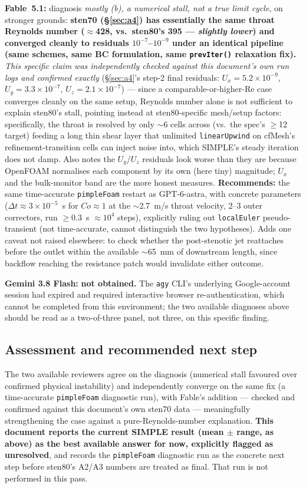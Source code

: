 \documentclass[11pt]{article}
\begin{document}
\textbf{Fable~5.1:} diagnosis \emph{mostly (b), a numerical stall, not a true limit cycle}, on
stronger grounds: \textbf{sten70 (\S\ref{sec:a4}) has essentially the same throat Reynolds number
($\approx$428, vs.\ sten80's 395 --- \emph{slightly lower}) and converged cleanly to residuals
$10^{-7}$--$10^{-9}$ under an identical pipeline (same schemes, same BC formulation, same
\texttt{prevIter()} relaxation fix).} \emph{This specific claim was independently checked against
this document's own run logs and confirmed exactly} (\S\ref{sec:a4}'s step-2 final residuals:
$U_x\!=\!5.2\times10^{-9}$, $U_y\!=\!3.3\times10^{-7}$, $U_z\!=\!2.1\times10^{-7}$) --- since a
comparable-or-higher-Re case converges cleanly on the same setup, Reynolds number alone is not
sufficient to explain sten80's stall, pointing instead at sten80-specific mesh/setup factors:
specifically, the throat is resolved by only $\sim$6 cells across (vs.\ the spec's $\geq$12 target)
feeding a long thin shear layer that unlimited \texttt{linearUpwind} on cfMesh's refinement-transition
cells can inject noise into, which SIMPLE's steady iteration does not damp. Also notes the $U_y$/$U_z$
residuals look worse than they are because OpenFOAM normalises each component by its own (here tiny)
magnitude; $U_x$ and the bulk-monitor band are the more honest measures. \textbf{Recommends:} the same
time-accurate \texttt{pimpleFoam} restart as GPT-6-astra, with concrete parameters ($\Delta t\approx
3\times10^{-5}$~s for $Co\approx1$ at the $\sim$2.7~m/s throat velocity, 2--3 outer correctors, run
$\geq$0.3~s $\approx10^4$ steps), explicitly ruling out \texttt{localEuler} pseudo-transient (not
time-accurate, cannot distinguish the two hypotheses). Adds one caveat not raised elsewhere: to check
whether the post-stenotic jet reattaches before the outlet within the available $\sim$65~mm of
downstream length, since backflow reaching the resistance patch would invalidate either outcome.

\textbf{Gemini 3.8 Flash:} \textbf{not obtained.} The \texttt{agy} CLI's underlying Google-account
session had expired and required interactive browser re-authentication, which cannot be completed
from this environment; the two available diagnoses above should be read as a two-of-three panel, not
three, on this specific finding.

\subsection*{Assessment and recommended next step}
The two available reviewers agree on the diagnosis (numerical stall favoured over confirmed physical
instability) and independently converge on the same fix (a time-accurate \texttt{pimpleFoam}
diagnostic run), with Fable's addition --- checked and confirmed against this document's own sten70
data --- meaningfully strengthening the case against a pure-Reynolds-number explanation. \textbf{This
document reports the current SIMPLE result (mean $\pm$ range, as above) as the best available answer
for now, explicitly flagged as unresolved}, and records the \texttt{pimpleFoam} diagnostic run as the
concrete next step before sten80's A2/A3 numbers are treated as final. That run is not performed in
this pass.
\end{document}
